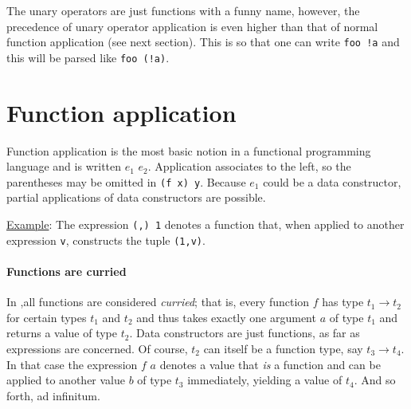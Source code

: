 The unary operators are just functions with a funny name, however, the precedence of unary operator application is even higher than that of normal function application (see next section). This is so that one can write \texttt{foo !a} and this will be parsed like \texttt{foo (!a)}.


\section{Function application}  \label{funapp} 

\begin{flushleft}
  \alt {} 
\end{flushleft}

Function application is the most basic notion in a functional programming language and is written $e_1$ $e_2$.
Application associates to the left, so the parentheses may be omitted in \texttt{(f x) y}.
Because $e_1$ could be a data constructor, partial applications of data constructors are possible.

\underline{Example}: The expression \texttt{(,) 1}
denotes a function that, when applied to another expression \texttt{v}, constructs the tuple \texttt{(1,v)}.

\paragraph*{Functions are curried}

In \frege{},all functions are considered \emph{curried}; that is, every function $f$ has type $t_1 \rightarrow{} t_2$ for certain types $t_1$ and $t_2$ and thus takes exactly one argument $a$ of type $t_1$ and returns a value of type $t_2$.
Data constructors are just functions, as far as expressions are concerned.
Of course, $t_2$ can itself be a function type, say $t_3 \rightarrow{} t_4$.
In that case the expression $f$ $a$ denotes a value that \emph{is} a function and can be applied to another value $b$ of type $t_3$ immediately, yielding a value of $t_4$. And so forth, ad infinitum.

